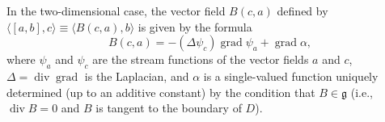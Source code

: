 In the two-dimensional case, the vector field $B(c, a)$ defined by $\langle [a, b], c \rangle \equiv \langle B(c, a), b \rangle$ is given by the formula
$$B(c, a) = -(\Delta \psi_c) \operatorname{grad} \psi_a + \operatorname{grad} \alpha,$$
where $\psi_a$ and $\psi_c$ are the stream functions of the vector fields $a$ and $c$, $\Delta = \operatorname{div} \operatorname{grad}$ is the Laplacian, and $\alpha$ is a single-valued function uniquely determined (up to an additive constant) by the condition that $B \in \mathfrak{g}$ (i.e., $\operatorname{div} B = 0$ and $B$ is tangent to the boundary of $D$).
